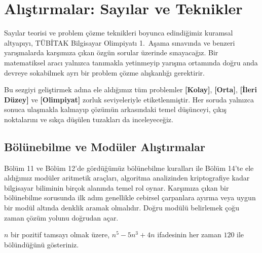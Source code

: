\chapter{Alıştırmalar: Sayılar ve Teknikler}

Sayılar teorisi ve problem çözme teknikleri boyunca edindiğimiz kuramsal altyapıyı, TÜBİTAK Bilgisayar Olimpiyatı 1.~Aşama sınavında ve benzeri yarışmalarda karşımıza çıkan özgün sorular üzerinde sınayacağız. Bir matematiksel aracı yalnızca tanımakla yetinmeyip yarışma ortamında doğru anda devreye sokabilmek ayrı bir problem çözme alışkanlığı gerektirir.

Bu sezgiyi geliştirmek adına ele aldığımız tüm problemler \textbf{[Kolay]}, \textbf{[Orta]}, \textbf{[İleri Düzey]} ve \textbf{[Olimpiyat]} zorluk seviyeleriyle etiketlenmiştir. Her soruda yalnızca sonuca ulaşmakla kalmayıp çözümün arkasındaki temel düşünceyi, çıkış noktalarını ve sıkça düşülen tuzakları da inceleyeceğiz.

\section{Bölünebilme ve Modüler Alıştırmalar}

Bölüm 11 ve Bölüm 12'de gördüğümüz bölünebilme kuralları ile Bölüm 14'te ele aldığımız modüler aritmetik araçları, algoritma analizinden kriptografiye kadar bilgisayar biliminin birçok alanında temel rol oynar. Karşımıza çıkan bir bölünebilme sorusunda ilk adım genellikle cebirsel çarpanlara ayırma veya uygun bir modül altında denklik aramak olmalıdır. Doğru modülü belirlemek çoğu zaman çözüm yolunu doğrudan açar.

\begin{example}
$n$ bir pozitif tamsayı olmak üzere, $n^5 - 5n^3 + 4n$ ifadesinin her zaman $120$ ile bölündüğünü gösteriniz.
\end{example}

